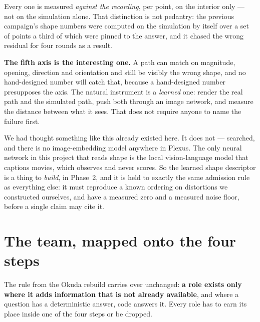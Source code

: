 \documentclass[11pt,a4paper]{article}
\begin{document}
Every one is measured \emph{against the recording}, per point, on the interior only --- not on the
simulation alone. That distinction is not pedantry: the previous campaign's shape numbers were
computed on the simulation by itself over a set of points a third of which were pinned to the
answer, and it chased the wrong residual for four rounds as a result.

\textbf{The fifth axis is the interesting one.} A path can match on magnitude, opening, direction
and orientation and still be visibly the wrong shape, and no hand-designed number will catch that,
because a hand-designed number presupposes the axis. The natural instrument is a \emph{learned}
one: render the real path and the simulated path, push both through an image network, and measure
the distance between what it sees. That does not require anyone to name the failure first.

We had thought something like this already existed here. It does not --- searched, and there is no
image-embedding model anywhere in Plexus. The only neural network in this project that reads shape
is the local vision-language model that captions movies, which observes and never scores. So the
learned shape descriptor is a thing to \emph{build}, in Phase~2, and it is held to exactly the same
admission rule as everything else: it must reproduce a known ordering on distortions we constructed
ourselves, and have a measured zero and a measured noise floor, before a single claim may cite it.

\section{The team, mapped onto the four steps}

The rule from the Okuda rebuild carries over unchanged: \textbf{a role exists only where it adds
information that is not already available}, and where a question has a deterministic answer, code
answers it. Every role has to earn its place inside one of the four steps or be dropped.
\end{document}
